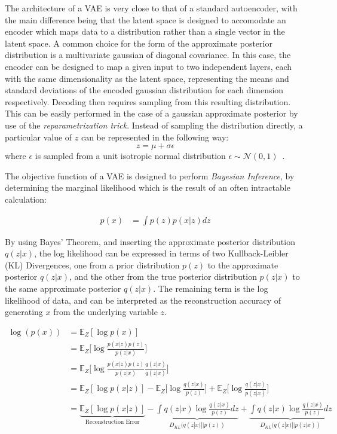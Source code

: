 \documentclass[12pt, a4paper]{article}
\begin{document}
The architecture of a VAE is very close to that of a standard autoencoder, with the main difference
being that the latent space is designed to accomodate an encoder which maps data to a distribution 
rather than a single vector in the latent space. A common choice for the form of the approximate 
posterior distribution is a multivariate gaussian of diagonal covariance. In this case, the encoder can be designed to map a given input to two independent layers, each with the same 
dimensionality as the latent space, representing the means and standard deviations of the encoded gaussian distribution for each dimension respectively. 
Decoding then requires sampling from this resulting distribution. 
This can be easily performed in the case of a gaussian approximate posterior by use of the \textit{reparametrization trick}.
Instead of sampling the distribution directly, a particular value of $z$ can be represented in the following way:
\[z=\mu + \sigma \epsilon\]
where $\epsilon$ is sampled from a unit isotropic normal distribution $\epsilon \sim \mathcal{N}(0, 1)$~\cite{kingma2014autoencoding}.


The objective function of a VAE is designed to perform \textit{Bayesian Inference}, by determining the marginal likelihood which is the result of an often intractable calculation:

\begin{align*}
p(x) &= \int p(z)p(x|z)dz
\end{align*}

By using Bayes' Theorem, and inserting the approximate posterior distribution $q(z|x)$, the log likelihood can be expressed in terms of two Kullback-Leibler (KL) Divergences, one from a prior distribution $p(z)$ to the approximate posterior $q(z|x)$, and the other from the true posterior distribution $p(z|x)$ to the same approximate posterior $q(z|x)$. The remaining term is the log likelihood of data, and can be interpreted as the reconstruction accuracy of generating $x$ from the underlying variable $z$. 

\begin{equation}
	\begin{split}
		\log(p(x))  &= \mathbb{E}_Z[\log p(x)] \\
  		&= \mathbb{E}_Z\bigg[\log \frac{p(x|z)p(z)}{p(z|x)}\bigg] \\
  		&= \mathbb{E}_Z\bigg[\log \frac{p(x|z)p(z)}{p(z|x)} \frac{q(z|x)}{q(z|x)}\bigg] \\
  		&= \mathbb{E}_Z[\log p(x|z)] - \mathbb{E}_Z\bigg[\log \frac{q(z|x)}{p(z)}\bigg] + \mathbb{E}_Z \bigg[\log \frac{q(z|x)}{p(z|x)}\bigg] \\
  		&= \underbrace{\mathbb{E}_Z[\log p(x|z)]}_\text{Reconstruction Error} - \underbrace{\int q(z|x)\log \frac{q(z|x)}{p(z)}dz}_{D_{KL}(q(z|x)||p(z))} + \underbrace{\int q(z|x)\log \frac{q(z|x)}{p(z)}dz}_{D_{KL}(q(z|x)||p(z|x))}
  \end{split}
\end{equation} 
\end{document}
